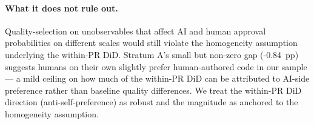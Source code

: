 \paragraph{What it does not rule out.} Quality-selection on unobservables that affect AI and human approval probabilities on different scales would still violate the homogeneity assumption underlying the within-PR DiD. Stratum A's small but non-zero gap (-0.84{}~pp) suggests humans on their own slightly prefer human-authored code in our sample --- a mild ceiling on how much of the within-PR DiD can be attributed to AI-side preference rather than baseline quality differences. We treat the within-PR DiD direction (anti-self-preference) as robust and the magnitude as anchored to the homogeneity assumption.

